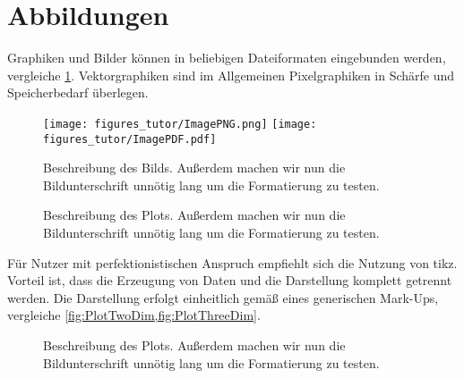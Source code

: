 \section{Abbildungen}
Graphiken und Bilder können in beliebigen Dateiformaten eingebunden werden, vergleiche \cref{fig:MyImage}. Vektorgraphiken sind im Allgemeinen Pixelgraphiken in Schärfe und Speicherbedarf überlegen.\par%
%
\begin{figure}[htb]%
    \centering%
    \texttt{[image: figures\_tutor/ImagePNG.png]}%
    \hspace*{5mm}%
    \texttt{[image: figures\_tutor/ImagePDF.pdf]}\par%
    \begingroup%
        \resizebox{40mm}{!}{}%
    \endgroup%
    \hspace*{5mm}%
    \begingroup%
        \def\svgwidth{40mm}%
        \fontsize{25}{25}\selectfont%
    \endgroup%
    \caption{Beschreibung des Bilds. Außerdem machen wir nun die Bildunterschrift unnötig lang um die Formatierung zu testen. \label{fig:MyImage}}%
\end{figure}%
%
\begin{figure}[htb]%
    \centering%
    \caption{Beschreibung des Plots. Außerdem machen wir nun die Bildunterschrift unnötig lang um die Formatierung zu testen. \label{fig:PlotTwoDim}}%
\end{figure}%
%
Für Nutzer mit perfektionistischen Anspruch empfiehlt sich die Nutzung von \gls{tikz}. Vorteil ist, dass die Erzeugung von Daten und die Darstellung komplett getrennt werden. Die Darstellung erfolgt einheitlich gemäß eines generischen Mark-Ups, vergleiche \cref{fig:PlotTwoDim,fig:PlotThreeDim}.\par%
%
\vspace{12pt}%
\begin{figure}[htb]%
    \centering%
    \caption{Beschreibung des Plots. Außerdem machen wir nun die Bildunterschrift unnötig lang um die Formatierung zu testen. \label{fig:PlotThreeDim}}%
\end{figure}%
%
%
